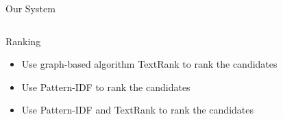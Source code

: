 \documentclass[final,hyperref={pdfpagelabels=false}]{beamer}
\begin{document}
\begin{frame}{}
\begin{block}{\large Our System}
\begin{columns}[t]
\begin{column}{.48\linewidth}
            \begin{block}{\Large Ranking}
              \begin{itemize}
                \item {\normalsize Use graph-based algorithm TextRank to rank the candidates}
                \item {\normalsize Use Pattern-IDF to rank the candidates}
                \item {\normalsize Use Pattern-IDF and TextRank to rank the candidates}
              \end{itemize}
            \end{block}

    
        \end{column}
        \begin{column}{.48\linewidth}
          \centering
          \begin{figure}

\end{figure}
\end{column}
\end{columns}
\end{block}
\end{frame}
\end{document}
